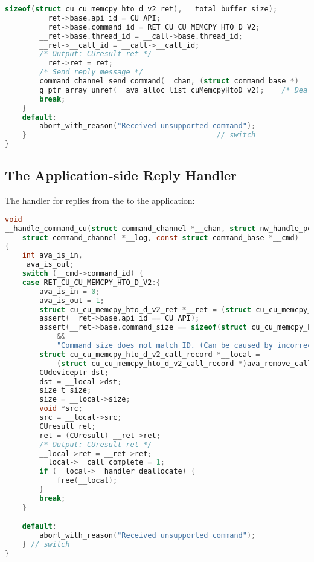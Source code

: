 \begin{lstlisting}[language=C,columns=flexible]
            sizeof(struct cu_cu_memcpy_hto_d_v2_ret), __total_buffer_size);
        __ret->base.api_id = CU_API;
        __ret->base.command_id = RET_CU_CU_MEMCPY_HTO_D_V2;
        __ret->base.thread_id = __call->base.thread_id;
        __ret->__call_id = __call->__call_id;
        /* Output: CUresult ret */
        __ret->ret = ret;
        /* Send reply message */
        command_channel_send_command(__chan, (struct command_base *)__ret);
        g_ptr_array_unref(__ava_alloc_list_cuMemcpyHtoD_v2);    /* Deallocate all memory in the alloc list */
        break;
    }
    default:
        abort_with_reason("Received unsupported command");
    }                                            // switch
}
\end{lstlisting}

\subsection{The Application-side Reply Handler}

The handler for replies from the \worker to the application:

\begin{lstlisting}[language=C,columns=flexible]
void
__handle_command_cu(struct command_channel *__chan, struct nw_handle_pool *handle_pool,
    struct command_channel *__log, const struct command_base *__cmd)
{
    int ava_is_in,
     ava_is_out;
    switch (__cmd->command_id) {
    case RET_CU_CU_MEMCPY_HTO_D_V2:{
        ava_is_in = 0;
        ava_is_out = 1;
        struct cu_cu_memcpy_hto_d_v2_ret *__ret = (struct cu_cu_memcpy_hto_d_v2_ret *)__cmd;
        assert(__ret->base.api_id == CU_API);
        assert(__ret->base.command_size == sizeof(struct cu_cu_memcpy_hto_d_v2_ret)
            &&
            "Command size does not match ID. (Can be caused by incorrectly computed buffer sizes, especially using `strlen(s)` instead of `strlen(s)+1`)");
        struct cu_cu_memcpy_hto_d_v2_call_record *__local =
            (struct cu_cu_memcpy_hto_d_v2_call_record *)ava_remove_call(&__ava_endpoint, __ret->__call_id);
        CUdeviceptr dst;
        dst = __local->dst;
        size_t size;
        size = __local->size;
        void *src;
        src = __local->src;
        CUresult ret;
        ret = (CUresult) __ret->ret;
        /* Output: CUresult ret */
        __local->ret = __ret->ret;
        __local->__call_complete = 1;
        if (__local->__handler_deallocate) {
            free(__local);
        }
        break;
    }

    default:
        abort_with_reason("Received unsupported command");
    } // switch
}
\end{lstlisting}